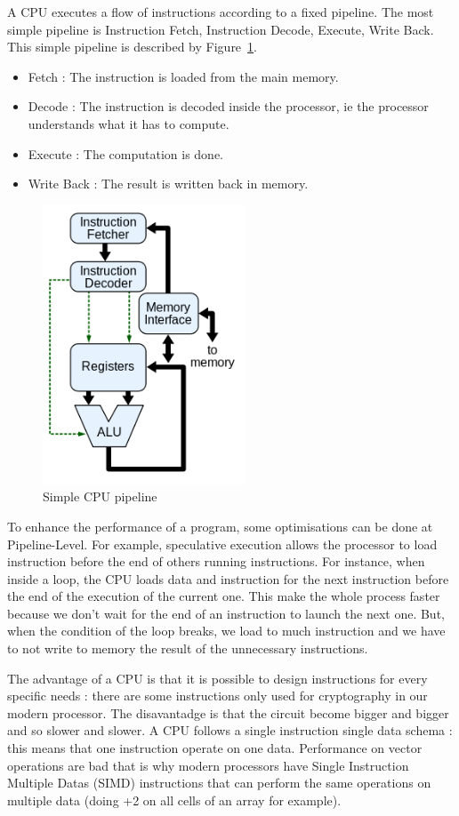 A CPU executes a flow of instructions according to a fixed pipeline. The most simple pipeline is Instruction Fetch, Instruction Decode, Execute, Write Back. This simple pipeline is described by Figure~\ref{fig:Pipeline}.
\begin{itemize}
\item Fetch : The instruction is loaded from the main memory.
\item Decode : The instruction is decoded inside the processor, ie the processor understands what it has to compute.
\item Execute : The computation is done.
\item Write Back : The result is written back in memory.
\end{itemize}

\begin{figure}
\centering
\includegraphics[width=6cm]{gfx/Parallelism/Pipeline.png}
\caption{Simple CPU pipeline}
\label{fig:Pipeline}
\end{figure}

To enhance the performance of a program, some optimisations can be done at Pipeline-Level. For example, speculative execution allows the processor to load instruction before the end of others running instructions. For instance, when inside a loop, the CPU loads data and instruction for the next instruction before the end of the execution of the current one. This make the whole process faster because we don't wait for the end of an instruction to launch the next one. But, when the condition of the loop breaks, we load to much instruction and we have to not write to memory the result of the unnecessary instructions.

The advantage of a CPU is that it is possible to design instructions for every specific needs : there are some instructions only used for cryptography in our modern processor. The disavantadge is that the circuit become bigger and bigger and so slower and slower. A CPU follows a single instruction single data  schema : this means that one instruction operate on one data. Performance on vector operations are bad that is why modern processors have Single Instruction Multiple Datas (SIMD) instructions that can perform the same operations on multiple data (doing +2 on all cells of an array for example).

